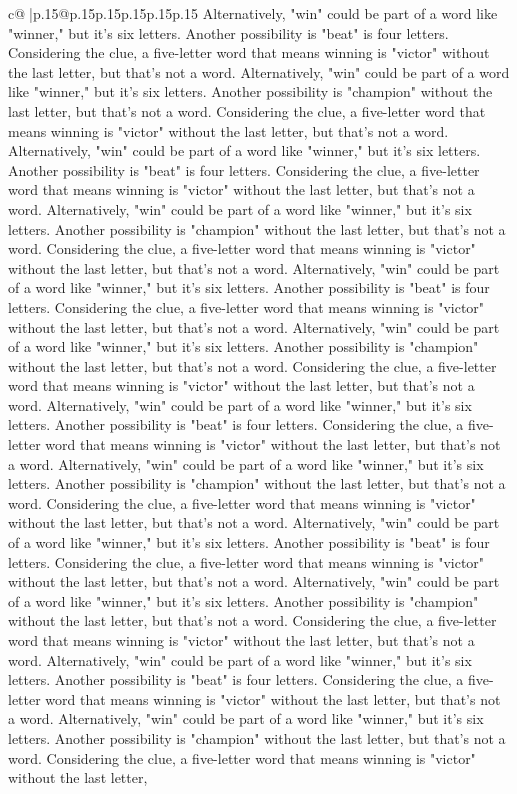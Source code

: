 \documentclass{article}
\begin{document}
{\begin{supertabular}{c@{$\;$}|p{.15\linewidth}@{}p{.15\linewidth}p{.15\linewidth}p{.15\linewidth}p{.15\linewidth}p{.15\linewidth}}
{{{Alternatively, "win" could be part of a word like "winner," but it's six letters. Another possibility is "beat" is four letters. Considering the clue, a five{-}letter word that means winning is "victor" without the last letter, but that's not a word. Alternatively, "win" could be part of a word like "winner," but it's six letters. Another possibility is "champion" without the last letter, but that's not a word. Considering the clue, a five{-}letter word that means winning is "victor" without the last letter, but that's not a word. Alternatively, "win" could be part of a word like "winner," but it's six letters. Another possibility is "beat" is four letters. Considering the clue, a five{-}letter word that means winning is "victor" without the last letter, but that's not a word. Alternatively, "win" could be part of a word like "winner," but it's six letters. Another possibility is "champion" without the last letter, but that's not a word. Considering the clue, a five{-}letter word that means winning is "victor" without the last letter, but that's not a word. Alternatively, "win" could be part of a word like "winner," but it's six letters. Another possibility is "beat" is four letters. Considering the clue, a five{-}letter word that means winning is "victor" without the last letter, but that's not a word. Alternatively, "win" could be part of a word like "winner," but it's six letters. Another possibility is "champion" without the last letter, but that's not a word. Considering the clue, a five{-}letter word that means winning is "victor" without the last letter, but that's not a word. Alternatively, "win" could be part of a word like "winner," but it's six letters. Another possibility is "beat" is four letters. Considering the clue, a five{-}letter word that means winning is "victor" without the last letter, but that's not a word. Alternatively, "win" could be part of a word like "winner," but it's six letters. Another possibility is "champion" without the last letter, but that's not a word. Considering the clue, a five{-}letter word that means winning is "victor" without the last letter, but that's not a word. Alternatively, "win" could be part of a word like "winner," but it's six letters. Another possibility is "beat" is four letters. Considering the clue, a five{-}letter word that means winning is "victor" without the last letter, but that's not a word. Alternatively, "win" could be part of a word like "winner," but it's six letters. Another possibility is "champion" without the last letter, but that's not a word. Considering the clue, a five{-}letter word that means winning is "victor" without the last letter, but that's not a word. Alternatively, "win" could be part of a word like "winner," but it's six letters. Another possibility is "beat" is four letters. Considering the clue, a five{-}letter word that means winning is "victor" without the last letter, but that's not a word. Alternatively, "win" could be part of a word like "winner," but it's six letters. Another possibility is "champion" without the last letter, but that's not a word. Considering the clue, a five{-}letter word that means winning is "victor" without the last letter, }}}
\end{supertabular}}
\end{document}
